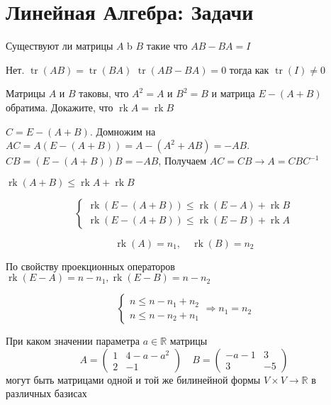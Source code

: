 \section{Линейная Алгебра: Задачи}
\begin{problem}
	Существуют ли матрицы $A$ b $ B $ такие что $A B-B A=I$
\end{problem}

\begin{solution}
	Нет. $\operatorname{tr}(A B)=\operatorname{tr}(B A)$  $\operatorname{tr}(A B-B A)=0$ тогда как
	$\operatorname{tr}(I) \neq 0$
\end{solution}

\begin{problem}
 Матрицы $ A $ и $ B $ таковы, что $ A^2 = A $ и $ B^2 = B $ и матрица $ E - (A + B) $ обратима. Докажите, что $ \operatorname{rk} A = \operatorname{rk} B $

\end{problem}
\begin{solution}
	$ C = E - (A+B) $. Домножим на $ A C =  A \left(E - (A+B)\right) = A - (A^2 + AB) = - AB $. $ CB = \left(E - (A+B)\right) B  = - AB $, Получаем $ AC = CB \rightarrow A = CBC^{-1}$
	
\end{solution}	

\begin{solution}
$\operatorname{rk}(A+B) \leqslant \operatorname{rk}A+\operatorname{rk}B$

$$
\left\{\begin{array}{l}{\operatorname{rk} (E-(A+B))} \leqslant \operatorname{rk}(E-A) + \operatorname{rk} B \\ {\operatorname{rk}(E-(A+B))}  \leqslant \operatorname{rk}(E-B) + \operatorname{rk} A \end{array}\right.
$$


$$
\operatorname{rk}(A) = n_1, \quad \operatorname{rk}(B) = n_2
$$

По свойству проекционных операторов 
$
 \operatorname{rk}(E-A) = n - n_1 , \operatorname{rk}(E-B) = n - n_2
$

$$
\left\{\begin{array}{l}
{n\leqslant n - n_1 + n_2}\\{n\leqslant n - n_2 + n_1}
		
\end{array}\right. \Longrightarrow n_1 = n_2
$$		
\end{solution}

\begin{problem}
	При каком значении параметра $ a \in \mathbb{R}  $ матрицы
	$$
	A=\left(\begin{array}{cc}{1} & {4-a-a^{2}} \\ {2} & {-1}\end{array}\right) \quad B=\left(\begin{array}{cc}{-a-1} & {3} \\ {3} & {-5}\end{array}\right)
	$$
	могут быть матрицами одной и той же билинейной формы $
	V \times V \rightarrow \mathbb{R}
	$ в различных базисах
	
\end{problem}

